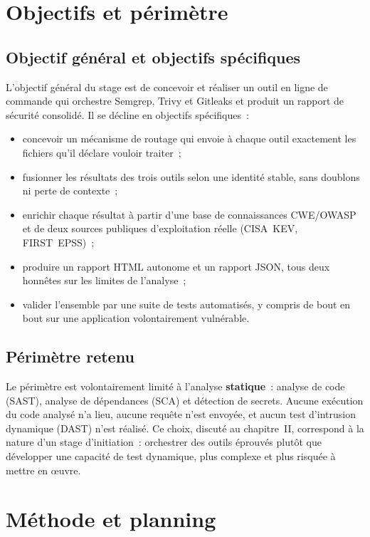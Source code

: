 \documentclass[12pt,a4paper,oneside]{report}
\begin{document}
\section{Objectifs et p\'erim\`etre}

\subsection{Objectif g\'en\'eral et objectifs sp\'ecifiques}
L'objectif g\'en\'eral du stage est de concevoir et r\'ealiser un outil en ligne de commande qui orchestre Semgrep, Trivy et Gitleaks et produit un rapport de s\'ecurit\'e consolid\'e. Il se d\'ecline en objectifs sp\'ecifiques~:
\begin{itemize}
\item concevoir un m\'ecanisme de routage qui envoie \`a chaque outil exactement les fichiers qu'il d\'eclare vouloir traiter~;
\item fusionner les r\'esultats des trois outils selon une identit\'e stable, sans doublons ni perte de contexte~;
\item enrichir chaque r\'esultat \`a partir d'une base de connaissances CWE/OWASP et de deux sources publiques d'exploitation r\'eelle (CISA~KEV, FIRST~EPSS)~;
\item produire un rapport HTML autonome et un rapport JSON, tous deux honn\^etes sur les limites de l'analyse~;
\item valider l'ensemble par une suite de tests automatis\'es, y compris de bout en bout sur une application volontairement vuln\'erable.
\end{itemize}

\subsection{P\'erim\`etre retenu}
Le p\'erim\`etre est volontairement limit\'e \`a l'analyse \textbf{statique}~: analyse de code (SAST), analyse de d\'ependances (SCA) et d\'etection de secrets. Aucune ex\'ecution du code analys\'e n'a lieu, aucune requ\^ete n'est envoy\'ee, et aucun test d'intrusion dynamique (DAST) n'est r\'ealis\'e. Ce choix, discut\'e au chapitre~II, correspond \`a la nature d'un stage d'initiation~: orchestrer des outils \'eprouv\'es plut\^ot que d\'evelopper une capacit\'e de test dynamique, plus complexe et plus risqu\'ee \`a mettre en \oe uvre.

\section{M\'ethode et planning}
\end{document}
